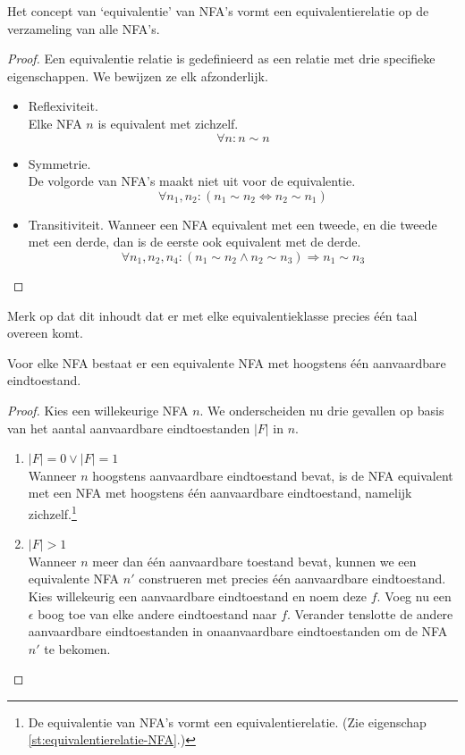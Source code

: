 \documentclass[main.tex]{subfiles}
\begin{document}
\begin{st}
  \label{st:equivalentierelatie-NFA}
  Het concept van `equivalentie' van NFA's vormt een equivalentierelatie op de verzameling van alle NFA's.

  \begin{proof}
    Een equivalentie relatie is gedefinieerd as een relatie met drie specifieke eigenschappen.
    We bewijzen ze elk afzonderlijk.
    \begin{itemize}
    \item Reflexiviteit.\\
      Elke NFA $n$ is equivalent met zichzelf.
      \[ \forall n: n \sim n \]
    \item Symmetrie.\\
      De volgorde van NFA's maakt niet uit voor de equivalentie.
      \[ \forall n_{1},n_{2}: (n_{1} \sim n_{2} \Leftrightarrow n_{2} \sim n_{1}) \]
    \item Transitiviteit.
      Wanneer een NFA equivalent met een tweede, en die tweede met een derde, dan is de eerste ook equivalent met de derde.
      \[ \forall n_{1}, n_{2}, n_{4}: (n_{1} \sim n_{2} \wedge n_{2} \sim n_{3}) \Rightarrow n_{1} \sim n_{3} \]
    \end{itemize}
  \end{proof}
  Merk op dat dit inhoudt dat er met elke equivalentieklasse precies \'e\'en taal overeen komt.
\end{st}

\begin{st}
  \label{st:hoogstens-een-eindtoestand-NFA}
  Voor elke NFA bestaat er een equivalente NFA met hoogstens \'e\'en aanvaardbare eindtoestand.

  \begin{proof}
    Kies een willekeurige NFA $n$.
    We onderscheiden nu drie gevallen op basis van het aantal aanvaardbare eindtoestanden $|F|$ in $n$.
    \begin{enumerate}
    \item $|F| = 0 \vee |F| = 1$\\
      Wanneer $n$ hoogstens aanvaardbare eindtoestand bevat, is de NFA equivalent met een NFA met hoogstens \'e\'en aanvaardbare eindtoestand, namelijk zichzelf.\footnote{De equivalentie van NFA's vormt een equivalentierelatie. (Zie eigenschap \ref{st:equivalentierelatie-NFA}.)}
    \item $|F| > 1$\\
      Wanneer $n$ meer dan \'e\'en aanvaardbare toestand bevat, kunnen we een equivalente NFA $n'$ construeren met precies \'e\'en aanvaardbare eindtoestand.
      Kies willekeurig een aanvaardbare eindtoestand en noem deze $f$. 
      Voeg nu een $\epsilon$ boog toe van elke andere eindtoestand naar $f$.
      Verander tenslotte de andere aanvaardbare eindtoestanden in onaanvaardbare eindtoestanden om de NFA $n'$ te bekomen.
    \end{enumerate}
  \end{proof}
\end{st}
\end{document}
